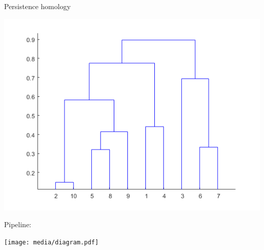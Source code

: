 \documentclass[10pt,t, handout]{beamer} %
\begin{document}
\begin{frame}{Persistence homology}
	\begin{center}
		\includegraphics[scale=.2]{media/dendogram}
	\end{center}

	\pause
	\vskip -10pt
	
	\textcolor{pblue}{Pipeline:}
	\begin{center}
		\texttt{[image: media/diagram.pdf]}
	\end{center}
\end{frame}
\end{document}
